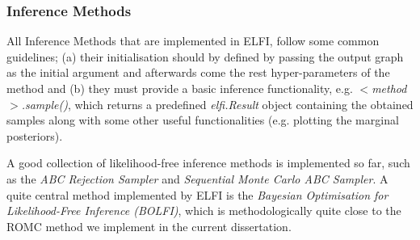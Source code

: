 \subsubsection{Inference Methods}
\label{sec:inference-methods}

All Inference Methods that are implemented in ELFI, follow some common
guidelines; (a) their initialisation should by defined by passing the
output graph as the initial argument and afterwards come the rest
hyper-parameters of the method and (b) they must provide a basic
inference functionality, e.g. $<$\textit{method}$>$\textit{.sample()},
which returns a predefined \textit{elfi.Result} object containing the
obtained samples along with some other useful functionalities
(e.g. plotting the marginal posteriors).

A good collection of likelihood-free inference methods is implemented
so far, such as the \textit{ABC Rejection Sampler} and
\textit{Sequential Monte Carlo ABC Sampler}. A quite central method
implemented by ELFI is the \textit{Bayesian Optimisation for
  Likelihood-Free Inference (BOLFI)}, which is methodologically quite
close to the ROMC method we implement in the current dissertation.



